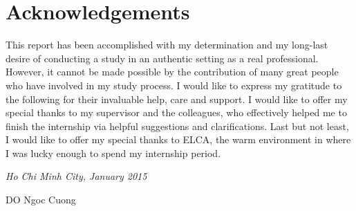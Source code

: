 \documentclass[a4paper,12pt]{report}
\begin{document}
\section*{Acknowledgements}
This report has been accomplished with my determination and my long-last desire of conducting a study in an authentic setting as a real professional. However, it cannot be made possible by the contribution of many great people who have involved in my study process. I would like to express my gratitude to the following for their invaluable help, care and support. I would like to offer my special thanks to my supervisor and the colleagues, who effectively helped me to finish the internship via helpful suggestions and clarifications. Last but not least, I would like to offer my special thanks to ELCA, the warm environment in where I was lucky enough to spend my internship period.
\begin{flushright}
\emph{Ho Chi Minh City, January 2015}\\
\begin{minipage}[c]{0.3\textwidth}
DO Ngoc Cuong	
\end{minipage}	
\end{flushright}
%






 
\end{document}
